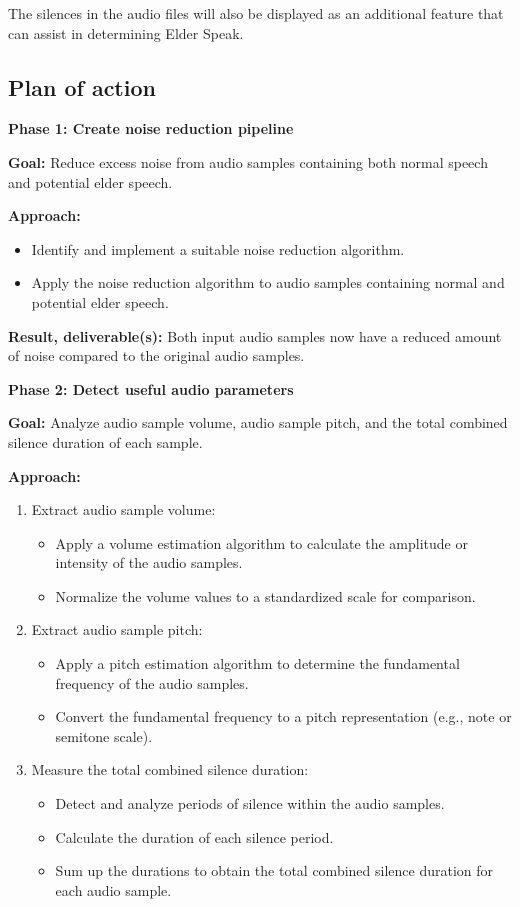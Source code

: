 \documentclass[english]{hogent-article}
\begin{document}
The silences in the audio files will also be displayed as an additional feature that can assist in determining Elder Speak.

\subsection*{Plan of action}
\label{subsec:plan-of-action}

\textbf{Phase 1: Create noise reduction pipeline}

\textbf{Goal:} Reduce excess noise from audio samples containing both normal speech and potential elder speech.

\textbf{Approach:}
\begin{itemize}
    \item Identify and implement a suitable noise reduction algorithm.
    \item Apply the noise reduction algorithm to audio samples containing normal and potential elder speech.
\end{itemize}

\textbf{Result, deliverable(s):} Both input audio samples now have a reduced amount of noise compared to the original audio samples.

\textbf{Phase 2: Detect useful audio parameters}

\textbf{Goal:} Analyze audio sample volume, audio sample pitch, and the total combined silence duration of each sample.

\textbf{Approach:}
\begin{enumerate}
    \item Extract audio sample volume:
    \begin{itemize}
        \item Apply a volume estimation algorithm to calculate the amplitude or intensity of the audio samples.
        \item Normalize the volume values to a standardized scale for comparison.
    \end{itemize}
    \item Extract audio sample pitch:
    \begin{itemize}
        \item Apply a pitch estimation algorithm to determine the fundamental frequency of the audio samples.
        \item Convert the fundamental frequency to a pitch representation (e.g., note or semitone scale).
    \end{itemize}
    \item Measure the total combined silence duration:
    \begin{itemize}
        \item Detect and analyze periods of silence within the audio samples.
        \item Calculate the duration of each silence period.
        \item Sum up the durations to obtain the total combined silence duration for each audio sample.
    \end{itemize}
\end{enumerate}
\end{document}
